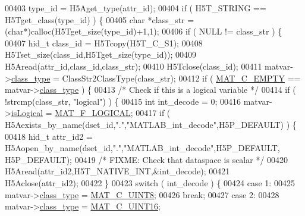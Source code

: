 \begin{DoxyCode}
00403     type\_id  = H5Aget\_type(attr\_id);
00404     \textcolor{keywordflow}{if} ( H5T\_STRING == H5Tget\_class(type\_id) ) \{
00405         \textcolor{keywordtype}{char} *class\_str = (\textcolor{keywordtype}{char}*)calloc(H5Tget\_size(type\_id)+1,1);
00406         \textcolor{keywordflow}{if} ( NULL != class\_str ) \{
00407             hid\_t class\_id = H5Tcopy(H5T\_C\_S1);
00408             H5Tset\_size(class\_id,H5Tget\_size(type\_id));
00409             H5Aread(attr\_id,class\_id,class\_str);
00410             H5Tclose(class\_id);
00411             matvar->\hyperlink{group___m_a_t_aff13035bf3265dd7d9425e5d40c839d4}{class\_type} = ClassStr2ClassType(class\_str);
00412             \textcolor{keywordflow}{if} ( \hyperlink{group___m_a_t_ggad4d60ae7b709fc81bfd744fb4c857c40a5c76eef0ca0373d25abe49053be6fa9a}{MAT\_C\_EMPTY} == matvar->\hyperlink{group___m_a_t_aff13035bf3265dd7d9425e5d40c839d4}{class\_type} ) \{
00413                 \textcolor{comment}{/* Check if this is a logical variable */}
00414                 \textcolor{keywordflow}{if} ( !strcmp(class\_str, \textcolor{stringliteral}{"logical"}) ) \{
00415                     \textcolor{keywordtype}{int} int\_decode = 0;
00416                     matvar->\hyperlink{group___m_a_t_a866c1539e68073a837833d74cd4a65be}{isLogical} = \hyperlink{group___m_a_t_ggab9d6ef9e3ddca78a317b173f01d53fbba57eb5c6e200bcbc0f1b7982f29a169c2}{MAT\_F\_LOGICAL};
00417                     \textcolor{keywordflow}{if} ( H5Aexists\_by\_name(dset\_id,\textcolor{stringliteral}{"."},\textcolor{stringliteral}{"MATLAB\_int\_decode"},H5P\_DEFAULT) ) \{
00418                         hid\_t attr\_id2 = H5Aopen\_by\_name(dset\_id,\textcolor{stringliteral}{"."},\textcolor{stringliteral}{"MATLAB\_int\_decode"},H5P\_DEFAULT,
      H5P\_DEFAULT);
00419                         \textcolor{comment}{/* FIXME: Check that dataspace is scalar */}
00420                         H5Aread(attr\_id2,H5T\_NATIVE\_INT,&int\_decode);
00421                         H5Aclose(attr\_id2);
00422                     \}
00423                     \textcolor{keywordflow}{switch} ( int\_decode ) \{
00424                         \textcolor{keywordflow}{case} 1:
00425                             matvar->\hyperlink{group___m_a_t_aff13035bf3265dd7d9425e5d40c839d4}{class\_type} = \hyperlink{group___m_a_t_ggad4d60ae7b709fc81bfd744fb4c857c40a81270f8093cb4808e992c1d29d84d4e3}{MAT\_C\_UINT8};
00426                             \textcolor{keywordflow}{break};
00427                         \textcolor{keywordflow}{case} 2:
00428                             matvar->\hyperlink{group___m_a_t_aff13035bf3265dd7d9425e5d40c839d4}{class\_type} = \hyperlink{group___m_a_t_ggad4d60ae7b709fc81bfd744fb4c857c40a8bede21dbf6c1edc0bbccc1481bccae7}{MAT\_C\_UINT16};

\end{DoxyCode}
